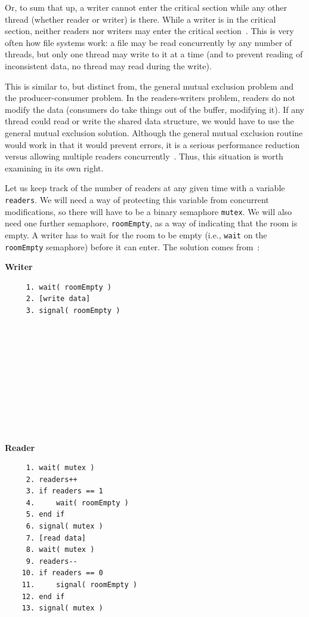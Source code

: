 Or, to sum that up, a writer cannot enter the critical section while any other thread (whether reader or writer) is there. While a writer is in the critical section, neither readers nor writers may enter the critical section~\cite{lbs}. This is very often how file systems work: a file may be read concurrently by any number of threads, but only one thread may write to it at a time (and to prevent reading of inconsistent data, no thread may read during the write).

This is similar to, but distinct from, the general mutual exclusion problem and the producer-consumer problem. In the readers-writers problem, readers do not modify the data (consumers do take things out of the buffer, modifying it). If any thread could read or write the shared data structure, we would have to use the general mutual exclusion solution. Although the general mutual exclusion routine would work in that it would prevent errors, it is a serious performance reduction versus allowing multiple readers concurrently~\cite{osi}. Thus, this situation is worth examining in its own right.

Let us keep track of the number of readers at any given time with a variable \texttt{readers}. We will need a way of protecting this variable from concurrent modifications, so there will have to be a binary semaphore \texttt{mutex}. We will also need one further semaphore, \texttt{roomEmpty}, as a way of indicating that the room is empty. A writer has to wait for the room to be empty (i.e., \texttt{wait} on the \texttt{roomEmpty} semaphore) before it can enter. The solution comes from~\cite{lbs}:

\begin{multicols}{2}
\textbf{Writer}\vspace{-2em}
  \begin{verbatim}
	 1. wait( roomEmpty )
	 2. [write data]
	 3. signal( roomEmpty )
	 
	 
	 
	 
	 
	 
	 
	 
	 
	 
  \end{verbatim}
\columnbreak
\textbf{Reader}\vspace{-2em}
  \begin{verbatim}
	 1. wait( mutex )
	 2. readers++
	 3. if readers == 1
	 4.     wait( roomEmpty )
	 5. end if
	 6. signal( mutex )
	 7. [read data]
	 8. wait( mutex )
	 9. readers--
	10. if readers == 0
	11.     signal( roomEmpty )
	12. end if
	13. signal( mutex )
  \end{verbatim}
\end{multicols}
\vspace{-2em}

